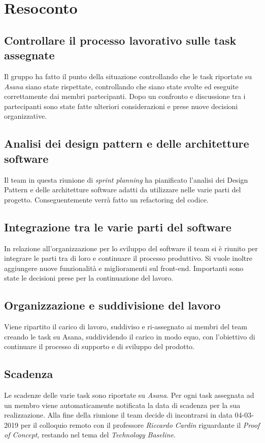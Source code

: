 \clearpage
\section{Resoconto}
	\subsection{Controllare il processo lavorativo sulle task assegnate}
	\label{sec:controllo_processo}
	Il gruppo ha fatto il punto della situazione controllando che le task riportate su \textit{Asana} siano state rispettate, controllando che siano state svolte ed eseguite correttamente dai membri partecipanti. 
	Dopo un confronto e discussione tra i partecipanti sono state fatte ulteriori considerazioni e prese nuove decisioni organizzative.
	\subsection{Analisi dei design pattern e delle architetture software}
	\label{sec:analisi_dp}
	Il team in questa riunione di \textit{sprint planning} ha pianificato l'analisi dei Design Pattern e delle architetture software adatti da utilizzare nelle varie parti del progetto. Conseguentemente verrà fatto un refactoring del codice.
	\subsection{Integrazione tra le varie parti del software}
	\label{sec:integrazione}
	In relazione all'organizzazione per lo sviluppo del software il team si è riunito per integrare le parti tra di loro e continuare il processo produttivo. Si vuole inoltre aggiungere nuove funzionalità e miglioramenti sul front-end. Importanti sono state le decisioni prese per la continuazione del lavoro.
	\subsection{Organizzazione e suddivisione del lavoro}
	\label{sec:organizzazione}
	Viene ripartito il carico di lavoro, suddiviso e ri-assegnato ai membri del team creando le task su Asana, suddividendo il carico in modo equo, con l'obiettivo di continuare il processo di supporto e di sviluppo del prodotto.
	\subsection{Scadenza}
	\label{sec:scadenza}
	Le scadenze delle varie task sono riportate su \textit{Asana}. Per ogni task assegnata ad un membro viene automaticamente notificata la data di scadenza per la sua realizzazione. Alla fine della riunione il team decide di incontrarsi in data 04-03-2019 per il colloquio remoto con il professore \textit{Riccardo Cardin} riguardante il \textit{Proof of Concept}, restando nel tema del \textit{Technology Baseline}.